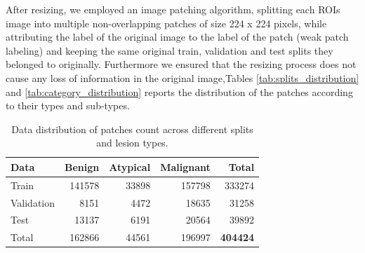 \documentclass[
11pt, %
english, %
singlespacing, %
headsepline, %
]{project_structure}
\begin{document}
\noindent After resizing, we employed an image patching algorithm, splitting each \acrshort{ROI}s image into multiple non-overlapping patches of size 224 x 224 pixels, while attributing the label of the original image to the label of the patch (weak patch labeling) and keeping the same original train, validation and test splits they belonged to originally. Furthermore we ensured that the resizing process does not cause any loss of information in the original image,Tables \autoref{tab:splits_distribution} and \autoref{tab:category_distribution} reports the distribution of the patches according to their types and sub-types.


\begin{table}[ht]
    \centering
    \small
    \begin{adjustbox}{max width=\textwidth} %
        \begin{tabular}{@{}l|rrrr}
            \toprule
            Data & Benign & Atypical & Malignant & Total \\
            \midrule
            Train & 141578 & 33898 & 157798 & 333274  \\
            Validation & 8151 & 4472 & 18635 & 31258 \\
            Test & 13137 & 6191 & 20564 & 39892 \\
            \midrule
            Total & 162866 & 44561 & 196997 & \textbf{404424}\\
            \bottomrule
        \end{tabular}
    \end{adjustbox}
    \caption{Data distribution of patches count across different splits and lesion types.}
    \label{tab:splits_distribution}
\end{table}
\end{document}
